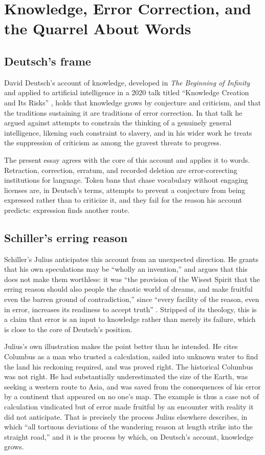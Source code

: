 \documentclass[11pt,a4paper]{article}
\theoremstyle{plain}
\theoremstyle{definition}
\theoremstyle{remark}
\begin{document}
\section{Knowledge, Error Correction, and the Quarrel About Words}

\subsection{Deutsch's frame}

David Deutsch's account of knowledge, developed in \emph{The Beginning of Infinity} \cite{deutsch2011} and applied to artificial intelligence in a 2020 talk titled ``Knowledge Creation and Its Risks'' \cite{deutsch2020}, holds that knowledge grows by conjecture and criticism, and that the traditions sustaining it are traditions of error correction. In that talk he argued against attempts to constrain the thinking of a genuinely general intelligence, likening such constraint to slavery, and in his wider work he treats the suppression of criticism as among the gravest threats to progress.

The present essay agrees with the core of this account and applies it to words. Retraction, correction, erratum, and recorded deletion are error-correcting institutions for language. Token bans that chase vocabulary without engaging licenses are, in Deutsch's terms, attempts to prevent a conjecture from being expressed rather than to criticize it, and they fail for the reason his account predicts: expression finds another route.

\subsection{Schiller's erring reason}

Schiller's Julius anticipates this account from an unexpected direction. He grants that his own speculations may be ``wholly an invention,'' and argues that this does not make them worthless: it was ``the provision of the Wisest Spirit that the erring reason should also people the chaotic world of dreams, and make fruitful even the barren ground of contradiction,'' since ``every facility of the reason, even in error, increases its readiness to accept truth'' \cite{schiller1786}. Stripped of its theology, this is a claim that error is an input to knowledge rather than merely its failure, which is close to the core of Deutsch's position.

Julius's own illustration makes the point better than he intended. He cites Columbus as a man who trusted a calculation, sailed into unknown water to find the land his reckoning required, and was proved right. The historical Columbus was not right. He had substantially underestimated the size of the Earth, was seeking a western route to Asia, and was saved from the consequences of his error by a continent that appeared on no one's map. The example is thus a case not of calculation vindicated but of error made fruitful by an encounter with reality it did not anticipate. That is precisely the process Julius elsewhere describes, in which ``all tortuous deviations of the wandering reason at length strike into the straight road,'' and it is the process by which, on Deutsch's account, knowledge grows.
\end{document}
